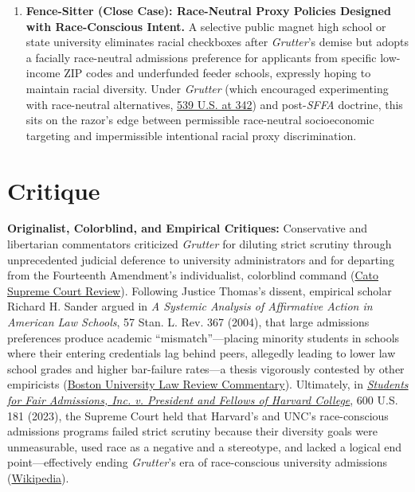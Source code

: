 \documentclass[12pt]{article}
\begin{document}
\begin{enumerate}
    \item \textbf{Fence-Sitter (Close Case): Race-Neutral Proxy Policies Designed with Race-Conscious Intent.} A selective public magnet high school or state university eliminates racial checkboxes after \textit{Grutter}'s demise but adopts a facially race-neutral admissions preference for applicants from specific low-income ZIP codes and underfunded feeder schools, expressly hoping to maintain racial diversity. Under \textit{Grutter} (which encouraged experimenting with race-neutral alternatives, \href{https://supreme.justia.com/cases/federal/us/539/306/}{539 U.S. at 342}) and post-\textit{SFFA} doctrine, this sits on the razor's edge between permissible race-neutral socioeconomic targeting and impermissible intentional racial proxy discrimination.
\end{enumerate}

\section{Critique}
\textbf{Originalist, Colorblind, and Empirical Critiques:} Conservative and libertarian commentators criticized \textit{Grutter} for diluting strict scrutiny through unprecedented judicial deference to university administrators and for departing from the Fourteenth Amendment's individualist, colorblind command (\href{https://www.cato.org/supreme-court-review/2002-2003/principle-policy-public-university-admissions-grutter-v-bollinger}{Cato Supreme Court Review}). Following Justice Thomas's dissent, empirical scholar Richard H. Sander argued in \textit{A Systemic Analysis of Affirmative Action in American Law Schools}, 57 Stan. L. Rev. 367 (2004), that large admissions preferences produce academic ``mismatch''---placing minority students in schools where their entering credentials lag behind peers, allegedly leading to lower law school grades and higher bar-failure rates---a thesis vigorously contested by other empiricists (\href{https://scholarship.law.bu.edu/cgi/viewcontent.cgi?article=1325&context=faculty_scholarship}{Boston University Law Review Commentary}). Ultimately, in \href{https://supreme.justia.com/cases/federal/us/600/20-1199/}{\textit{Students for Fair Admissions, Inc. v. President and Fellows of Harvard College}}, 600 U.S. 181 (2023), the Supreme Court held that Harvard's and UNC's race-conscious admissions programs failed strict scrutiny because their diversity goals were unmeasurable, used race as a negative and a stereotype, and lacked a logical end point---effectively ending \textit{Grutter}'s era of race-conscious university admissions (\href{https://en.wikipedia.org/wiki/Grutter_v._Bollinger}{Wikipedia}).
\end{document}
